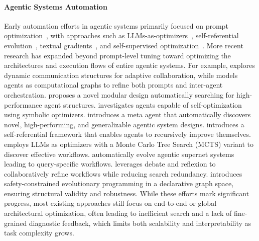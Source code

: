 \documentclass{article}
\theoremstyle{plain}
\theoremstyle{definition}
\theoremstyle{remark}
\begin{document}
\paragraph{Agentic Systems Automation} 
Early automation efforts in agentic systems primarily focused on prompt optimization~\citep{pryzant_automatic_2023, ramnath_systematic_2025, li_survey_2025}, with approaches such as LLMs-as-optimizers~\citep{yang_large_2024}, self-referential evolution~\citep{fernando_promptbreeder_2023}, textual gradients~\citep{yuksekgonul_textgrad_2024}, and self-supervised optimization~\citep{xiang_self-supervised_2025}. More recent research has expanded beyond prompt-level tuning toward optimizing the architectures and execution flows of entire agentic systems. For example, \citet{liu_dynamic_2024} explores dynamic communication structures for adaptive collaboration, while \citet{zhuge_language_2024} models agents as computational graphs to refine both prompts and inter-agent orchestration. \citet{shang_agentsquare_2024} proposes a novel modular design automatically searching for high-performance agent structures. \citet{zhou_symbolic_2024} investigates agents capable of self-optimization using symbolic optimizers. \citet{hu_automated_2025} introduces a meta agent that automatically discovers novel, high-performing, and generalizable agentic system designs. \citet{yin_goagent_2025} introduces a self-referential framework that enables agents to recursively improve themselves. \citet{zhang_aflow_2025} employs LLMs as optimizers with a Monte Carlo Tree Search (MCTS) variant to discover effective workflows. \citet{zhang_multi-agent_2025} automatically evolve agentic supernet systems leading to query-specific workflows. \citet{su_debflow_2025} leverages debate and reflexion to collaboratively refine workflows while reducing search redundancy. \citet{zheng_mermaidflow_2025} introduces safety-constrained evolutionary programming in a declarative graph space, ensuring structural validity and robustness. While these efforts mark significant progress, most existing approaches still focus on end-to-end or global architectural optimization, often leading to inefficient search and a lack of fine-grained diagnostic feedback, which limits both scalability and interpretability as task complexity grows.
\end{document}
